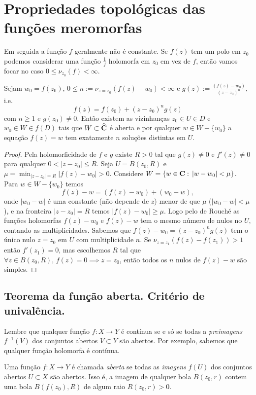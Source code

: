 \section{Propriedades topológicas das funções meromorfas}

Em seguida a função $f$ geralmente não é constante.
Se $f(z)$ tem um polo em $z_0$ podemos considerar uma função $\frac{1}{f}$ holomorfa em $z_0$
em vez de $f$, então vamos focar no caso $0\leq \nu_{z_0}(f) < \infty$.

\begin{lema}
\label{l:n-raizes}
Sejam $w_0 =f(z_0)$,
$0\leq n := \nu_{z=z_0}(f(z)-w_0) < \infty$ e $g(z) := \frac{(f(z)-w_0)}{(z-z_0)^n}$,
i.e. 
\[ f(z) = f(z_0) + (z-z_0)^n g(z) \]
 com $n\geq 1$ e $g(z_0)\neq 0$.
Então existem as vizinhanças $z_0 \in U \in D$ e $w_0 \in W \in f(D)$
tais que $W\subset\widehat{\mathbf{C}}$ é aberta e por qualquer $w\in W-\{w_0\}$
a equação $f(z) = w$ tem exatamente $n$ soluções distintas em $U$.
\end{lema}
\begin{proof}
Pela holomorficidade de $f$ e $g$ existe $R>0$ tal que $g(z)\neq 0$
e $f'(z)\neq 0$ para
qualquer $0<|z-z_0|\leq R$. Seja $U = B(z_0,R)$ e 
$\mu = \min_{|z-z_0|=R} |f(z)-w_0| > 0$. Considere $W = \{ w\in\mathbf{C}:\, |w-w_0|<\mu \}$.
Para $w\in W - \{w_0\}$ temos
\[ f(z) - w = (f(z) - w_0) + (w_0-w), \]
onde $|w_0-w|$ é uma constante (não depende de $z$) menor de que $\mu$ ($|w_0-w|<\mu$),
e na fronteira $|z-z_0|=R$ temos
$|f(z) - w_0| \geq \mu$. Logo pelo  de Rouché
as funções holomorfas $f(z)-w_0$ e $f(z)-w$ tem o mesmo número de nulos no $U$, contando as multiplicidades.
Sabemos que $f(z)-w_0 = (z-z_0)^n g(z)$ tem o único nulo $z=z_0$ em $U$ com multiplicidade $n$.
Se $\nu_{z=z_1}(f(z)-f(z_1))>1$ então $f'(z_1)=0$, mas escolhemos $R$ tal que 
$\forall z\in B(z_0,R),\,f(z)=0 \implies z=z_0$, então todos os $n$ nulos de $f(z)-w$ são simples.
\end{proof}

\subsection{Teorema da função aberta. Critério de univalência.}
Lembre que qualquer função $f: X\to Y$ é contínua se e só se
todas a \emph{preimagens} $f^{-1}(V)$ dos conjuntos abertos $V\subset Y$ são abertos.
Por exemplo, sabemos que qualquer função holomorfa é contínua.

Uma função $f: X\to Y$ é chamada \emph{aberta} se todas as \emph{imagens} $f(U)$
dos conjuntos abertos $U\subset X$ são abertos. Isso é, a imagem de qualquer bola $B(z_0,r)$
contem uma bola $B(f(z_0),R)$ de algum raio $R(z_0,r)>0$.

